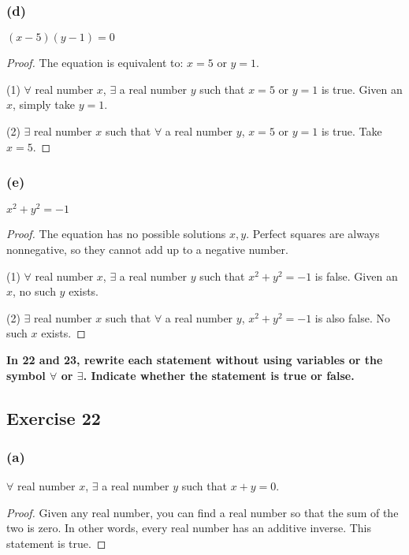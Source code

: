 \documentclass[14pt]{extarticle}
\newcommand{\fa}{\forall}
\newcommand{\te}{\exists}
\begin{document}
\subsubsection{(d)}
$(x - 5)(y - 1) = 0$

\begin{proof}
    The equation is equivalent to: $x = 5$ or $y = 1$.

    (1) $\fa$ real number $x$, $\te$ a real number $y$ such that $x = 5$ or $y = 1$ is true. Given an $x$, simply take $y = 1$.

    (2) $\te$ real number $x$ such that $\fa$ a real number $y$, $x = 5$ or $y = 1$ is true. Take $x = 5$.
\end{proof}

\subsubsection{(e)}
$x^2 + y^2 = -1$

\begin{proof}
    The equation has no possible solutions $x, y$. Perfect squares are always nonnegative, so they cannot add up to a negative number.

    (1) $\fa$ real number $x$, $\te$ a real number $y$ such that $x^2 + y^2 = -1$ is false. Given an $x$, no such $y$ exists.

    (2) $\te$ real number $x$ such that $\fa$ a real number $y$, $x^2 + y^2 = -1$ is also false. No such $x$ exists.
\end{proof}

{\bf \color{cyan} In 22 and 23, rewrite each statement without using variables or the symbol $\fa$ or $\te$. Indicate whether the statement is true or false.}

\subsection{Exercise 22}
\subsubsection{(a)}
$\fa$ real number $x$, $\te$ a real number $y$ such that $x + y = 0$.

\begin{proof}
    Given any real number, you can find a real number so that the sum of the two is zero. In other words, every real number has an additive inverse. This statement is true.
\end{proof}
\end{document}
